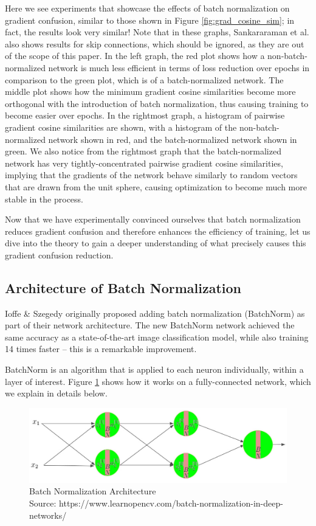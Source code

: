 \documentclass{article}
\begin{document}
Here we see experiments that showcase the effects of batch normalization on gradient confusion, similar to those shown in Figure \ref{fig:grad_cosine_sim}; in fact, the results look very similar! Note that in these graphs, Sankararaman et al. also shows results for skip connections, which should be ignored, as they are out of the scope of this paper. In the left graph, the red plot shows how a non-batch-normalized network is much less efficient in terms of loss reduction over epochs in comparison to the green plot, which is of a batch-normalized network. The middle plot shows how the minimum gradient cosine similarities become more orthogonal with the introduction of batch normalization, thus causing training to become easier over epochs. In the rightmost graph, a histogram of pairwise gradient cosine similarities are shown, with a histogram of the non-batch-normalized network shown in red, and the batch-normalized network shown in green. We also notice from the rightmost graph that the batch-normalized network has very tightly-concentrated pairwise gradient cosine similarities, implying that the gradients of the network behave similarly to random vectors that are drawn from the unit sphere, causing optimization to become much more stable in the process.

Now that we have experimentally convinced ourselves that batch normalization reduces gradient confusion and therefore enhances the efficiency of training, let us dive into the theory to gain a deeper understanding of what precisely causes this gradient confusion reduction.


\subsection{Architecture of Batch Normalization}

Ioffe \& Szegedy \cite{batchnorm} originally proposed adding batch normalization (BatchNorm) as part of their network architecture. The new BatchNorm network achieved the same accuracy as a state-of-the-art image classification model, while also training 14 times faster -- this is a remarkable improvement.

BatchNorm is an algorithm that is applied to each neuron individually, within a layer of interest. Figure \ref{fig:batchnorm} shows how it works on a fully-connected network, which we explain in details below.


\begin{figure}[h]
	\centering
    \includegraphics[width=\textwidth]{pics/batchNorm/batch-normalization.jpg}
	\caption{Batch Normalization Architecture\\Source: https://www.learnopencv.com/batch-normalization-in-deep-networks/}
	\label{fig:batchnorm}
\end{figure}
\end{document}
